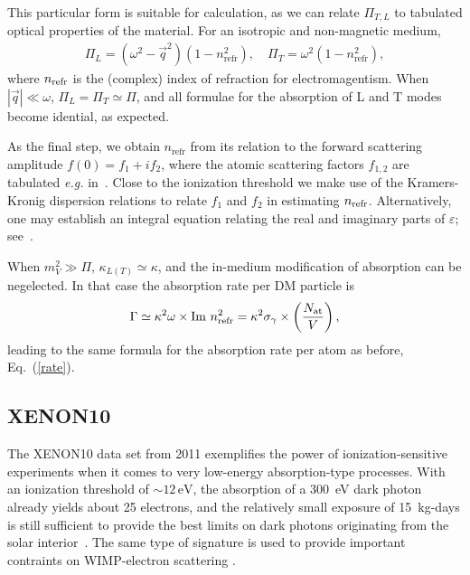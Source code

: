 \documentclass[prd,reprint,nofootinbib,notitlepage,aps,tightenlines,preprintnumbers,amsmath,amssymb,showpacs,superscriptaddress]{revtex4-1}
\newcommand{\eV}{\ensuremath{\mathrm{eV}}}
\begin{document}
This particular form is suitable for calculation, as we can relate $\Pi_{T,L}$ to
tabulated optical properties of the material. For an isotropic and
non-magnetic medium,
%
\begin{align}
  \Pi_{L} = (\omega^2 - \vec q^2) (1- n_{\mathrm{refr}}^2),\quad 
   \Pi_T = \omega^2 (1- n_{\mathrm{refr}}^2),
\end{align}
%
where $n_{\rm refr}$ is the (complex) index of
refraction for electromagentism. When $|\vec{q}|\ll \omega$, $\Pi_L=\Pi_T\simeq \Pi$, 
and all formulae for the absorption of L and T modes become idential, 
as expected. 

%
%
%
%
%
As the final step, we obtain $ n_{\mathrm{refr}} $ from its relation to
the forward scattering amplitude $f(0) = f_1 + i f_2$, where the atomic
scattering factors $f_{1,2}$ are tabulated \textit{e.g.}
in~\cite{Henke:1993eda}. Close to the ionization threshold we make use
of the Kramers-Kronig dispersion relations to relate $f_1$ and $f_2$
in estimating $n_{\rm refr}$. Alternatively, one may establish an
integral equation relating the real and imaginary parts of
$\varepsilon$; see~\cite{An:2013yua}.

When $m_V^2 \gg \Pi$, $\kappa_{L(T)} \simeq \kappa$, and the in-medium
modification of absorption can be negelected. In that case the
absorption rate per DM particle is
\begin{equation}
\Gamma \simeq \kappa^2 \omega \times  {\rm Im }~ n_{\mathrm{refr}}^2 = \kappa^2 \sigma_{\gamma}\times \left(\frac{N_{\rm at}}{V} \right),
\end{equation}
leading to the same formula for the absorption rate per atom as
before, Eq.~(\ref{rate}).




\subsection{XENON10}
\label{sec:xenon10-1}

The XENON10 data set from 2011 exemplifies the power of
ionization-sensitive experiments when it comes to very low-energy
absorption-type processes. With an ionization threshold of
$\sim 12\,\eV$, the absorption of a 300~eV dark photon already yields
about 25 electrons, and the relatively small exposure of 15~kg-days is
still sufficient to provide the best limits on dark photons originating
from the solar interior~\cite{An:2013yua}. The same type of signature 
is used to provide important contraints on WIMP-electron scattering \cite{Essig:2011nj,Essig:2012yx}. 
\end{document}

